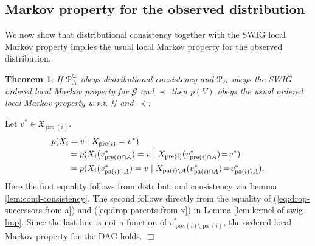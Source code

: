 \documentclass[11pt]{article}
\DeclareMathOperator{\pa}{pa}
\DeclareMathOperator{\pre}{pre}
\newtheorem{theorem}{Theorem}
\newcommand{\G}{{\mathscr G}}
\begin{document}
{\subsection{Markov property for the observed distribution}

We now show that distributional consistency together with the SWIG local Markov property implies the usual local Markov property 
\citep{lau:indmark} for the observed distribution. 

\begin{theorem}\label{thm:swig-obs-markov}
 If ${\cal P}^{\subseteq}_A$ obeys distributional consistency and ${\cal P}_A$  obeys the 
SWIG ordered local Markov property for $\G$  and $\prec$ then $p(V)$ obeys the usual ordered local Markov property w.r.t. $\G$ and $\prec$.
\end{theorem}




  Let $v^* \in \mathfrak{X}_{\pre(i)}$.
\begin{align}
\MoveEqLeft{p(X_i=v \mid X_{\pre(i)}=v^*)}\nonumber\\
&= p(X_i(v^*_{\pre(i)\cap A })=v \mid X_{\pre(i)}(v^*_{\pre(i)\cap A})\!=\!v^*)\nonumber\\
&= p(X_i(v^*_{\pa(i) \cap A})=v \mid X_{\pa(i)\setminus A}(v^*_{\pa(i) \cap A})\!=\!v^*_{\pa(i)\setminus A}).
\end{align}
Here the first equality follows from distributional consistency via Lemma \ref{lem:cond-consistency}.
The second follows directly from the equality of (\ref{eq:drop-successors-from-a}) and (\ref{eq:drop-parents-from-x}) in Lemma \ref{lem:kernel-of-swig-lmp}.
Since the last line is not a function of $v^*_{\pre(i)\setminus \pa(i)}$, the ordered local Markov property for the DAG holds.
\hfill$\Box$
\medskip

}
\end{document}

